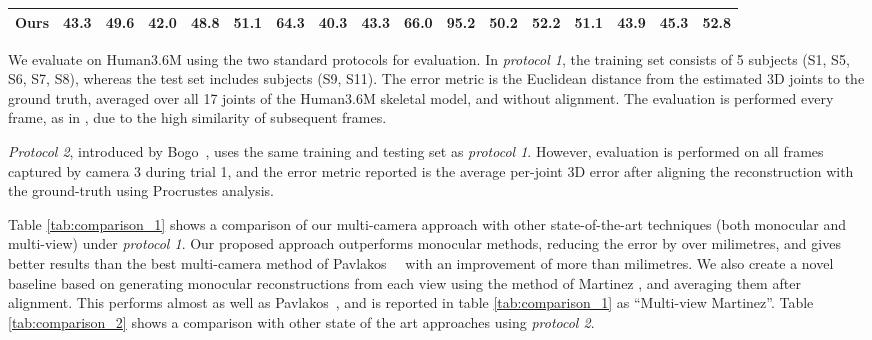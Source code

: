 \documentclass[10pt,twocolumn,letterpaper]{article}
\begin{document}
\begin{table*}
{\begin{tabular}{lcccccccccccccccc}
    \textbf{Ours} & \normalsize 43.3 & \normalsize 49.6 & \normalsize \textbf{42.0} & \normalsize 48.8 & \normalsize \textbf{51.1} & \normalsize 64.3 & \normalsize \textbf{40.3} & \normalsize \textbf{43.3} & \normalsize \textbf{66.0} & \normalsize 95.2 & \normalsize
              \textbf{50.2} & \normalsize 52.2 & \normalsize \textbf{51.1} & \normalsize 43.9 & \normalsize 45.3 & \normalsize \textbf{52.8}\\
    \hline
\bottomrule
   \end{tabular}
  }
\caption {Quantitative evaluation on the Human3.6M dataset. We report
   3D pose error results expressed in mm using the metric defined in
   protocol 1. All methods above the first line are monocular while
   those below (~\cite{trumble2017total,pavlakos2017harvesting} and
   {\bf Ours}) are multi-camera approaches.  `'Multi-View Martinez''
   refers to independently reconstructing from each monocular view
   using \cite{martinez2017simple} followed by averaging.
\label{tab:comparison_1}}
\end{table*}


We evaluate on Human3.6M using the two standard protocols for
evaluation. In \emph{protocol 1}, the training set consists of 5
subjects (S1, S5, S6, S7, S8), whereas the test set includes subjects
(S9, S11). The error metric is the Euclidean distance from the
estimated 3D joints to the ground truth, averaged over all 17 joints
of the Human3.6M skeletal model, and without alignment. The evaluation
is performed every  frame, as in
\cite{zhou2016sparseness}, due to the high similarity of subsequent
frames.

\emph{Protocol 2}, introduced by \mbox{Bogo \etal \cite{bogo2016keep}}, uses
the same training and testing set as \emph{protocol 1}. However, evaluation
is performed on all frames captured by camera 3 during trial 1, and the error
metric reported is the average per-joint 3D error after aligning the
reconstruction with the ground-truth using Procrustes
analysis. 


Table \ref{tab:comparison_1} shows a comparison of our multi-camera
approach with other state-of-the-art techniques (both monocular and
multi-view) under \emph{protocol 1}. Our proposed approach outperforms
monocular methods, reducing the error by over  milimetres, and
gives better results than the best multi-camera method of
Pavlakos~\etal~\cite{pavlakos2017harvesting} with an improvement of
more than  milimetres. We also create a novel baseline based on
generating monocular reconstructions from each view using the method
of Martinez \etal \cite{martinez2017simple}, and averaging them after
alignment. This performs almost as well as Pavlakos~\etal, and is
reported in table \ref{tab:comparison_1} as ``Multi-view Martinez''.
Table \ref{tab:comparison_2} shows a comparison with other state of
the art approaches using \emph{protocol 2}.
\end{document}
